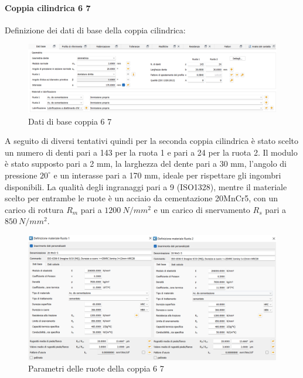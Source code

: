 \paragraph{Coppia cilindrica 6 7}
Definizione dei dati di base della coppia cilindrica:
\begin{figure}[h]
    \centering
    \includegraphics[scale=0.5]{Immagini/Coppia67.png}
    \caption{Dati di base coppia 6 7}
    \label{fig:Coppia67}
\end{figure}
\newpage
A seguito di diversi tentativi quindi per la seconda coppia cilindrica è stato scelto un numero di denti pari a 143 per la ruota 1 e pari a 24 per la ruota 2. Il modulo è stato supposto pari a 2 mm, la larghezza del dente pari a 30 mm, l’angolo di pressione $20^\circ$ e un interasse pari a 170 mm, ideale per rispettare gli ingombri disponibili. 
La qualità degli ingranaggi pari a 9 (ISO1328), mentre il materiale scelto per entrambe le ruote è un acciaio da cementazione 20MnCr5, con un carico di rottura $R_m$ pari a $1200\ N/mm^2$ e un carico di snervamento $R_s$ pari a $850\ N/mm^2$. 
\begin{figure}[h]
    \centering
    \includegraphics[scale=0.5]{Immagini/RuoteCoppia67.png}
    \caption{Parametri delle ruote della coppia 6 7}
    \label{fig:RuoteCoppia45}
\end{figure}


